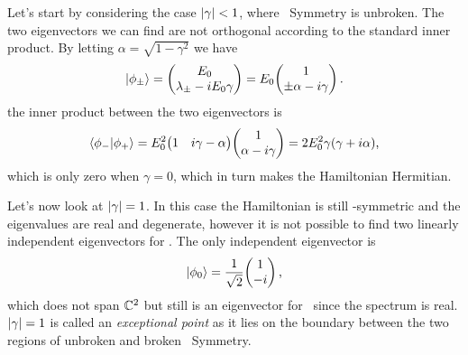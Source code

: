         Let's start by considering the case $\abs{\gamma} < 1$, where \PT\ Symmetry is unbroken. The two eigenvectors we can find are not orthogonal according to the standard inner product. By letting $\alpha = \sqrt{1 - \gamma^2}$ we have 
        \begin{equation*}
            \ket{\phi_\pm}
            = \pmqty{E_0 \\ \lambda_\pm - i E_0 \gamma}
            = E_0 \!\pmqty{1 \\ \pm \alpha - i \gamma}
            \myperiod
        \end{equation*}
        the inner product between the two eigenvectors is
        \begin{equation}
            \label{eq:ex:non-orthogonality}
            \bra{\phi_-}\ket{\phi_+}
            = E_0^2\! \pmqty{1 & i \gamma - \alpha}\!\pmqty{1 \\ \alpha -i \gamma}
            = 2 E_0^2 \gamma \pqty{\gamma + i \alpha}
            \mycomma
        \end{equation}
        which is only zero when $\gamma = 0$, which in turn makes the Hamiltonian Hermitian.

        Let's now look at $\abs{\gamma} = 1$. In this case the Hamiltonian is still \PT-symmetric and the eigenvalues are real and degenerate, however it is not possible to find two linearly independent eigenvectors for \hH. The only independent eigenvector is
        \begin{equation*}
            \ket{\phi_0} = \frac{1}{\sqrt{2}}\! \pmqty{1 \\ -i}
            \mycomma
        \end{equation*}
        which does not span $\mathbb{C}^2$ but still is an eigenvector for \hPT\ since the spectrum is real. $\abs{\gamma} = 1$ is called an \emph{exceptional point} as it lies on the boundary between the two regions of unbroken and broken \PT\ Symmetry.

